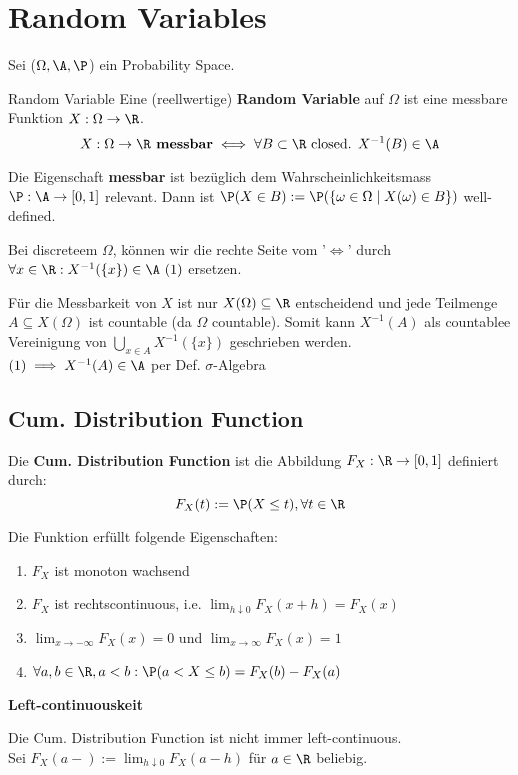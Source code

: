 \section{Random Variables}
Sei ($\Omega, \A, \P$) ein Probability Space.
\begin{mainbox}{Random Variable}
    Eine (reellwertige) \textbf{Random Variable} auf $\Omega$ ist eine messbare Funktion $X: \Omega \to \R$.
    $$X: \Omega \to \R \textbf{ messbar} \iff \forall B \subset \R \text { closed. } X^{-1}(B) \in \A$$
 
    Die Eigenschaft \textbf{messbar} ist bezüglich dem Wahrscheinlichkeitsmass $\P: \A \to [0,1]$ relevant. Dann ist $\P(X \in B) := \P(\{\omega \in \Omega \mid X(\omega) \in B\})$ well-defined.
\end{mainbox}
Bei discreteem $\Omega$, können wir die rechte Seite vom '$\iff$' durch $\forall x \in \R: X^{-1}(\{x\})\in \A \ (1)$ ersetzen. 

Für die Messbarkeit von $X$ ist nur $X(\Omega) \subseteq \R$ entscheidend und jede Teilmenge $A \subseteq X(\Omega)$ ist countable (da $\Omega$ countable). Somit kann $X^{-1}(A)$ als countablee Vereinigung von $\bigcup_{x \in A} X^{-1}(\{x\})$ geschrieben werden. 
\\$(1) \implies X^{-1}(A) \in \A$ per Def. $\sigma$-Algebra
\subsection{Cum. Distribution Function}
Die \textbf{Cum. Distribution Function} ist die Abbildung $F_X : \R \to [0,1]$ definiert durch:
$$F_X(t) := \P(X \leq t), \forall t \in \R$$

Die Funktion erfüllt folgende Eigenschaften:
\begin{enumerate}
    \item $F_X$ ist monoton wachsend 
    \item $F_X$ ist rechtscontinuous, i.e. $\lim_{h \downarrow 0}F_X(x+h) = F_X(x)$
    \item $\lim_{x \to -\infty}F_X(x) = 0$ und $\lim_{x \to \infty}F_X(x) = 1$
    \item $\forall a,b \in \R, a < b: \P(a < X \leq b) = F_X(b) -F_X(a)$ 
\end{enumerate}

\textbf{Left-continuouskeit}

Die Cum. Distribution Function ist nicht immer left-continuous.
\\Sei $F_X(a-) := \lim_{h \downarrow 0}F_X(a-h)$ für $a \in \R$ beliebig.

